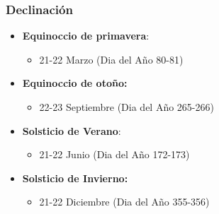 \documentclass[xcolor=dvipsnames]{beamer}
\begin{document}
\begin{frame}
  \frametitle{Declinación}
  \begin{itemize}
  \item \textbf{Equinoccio de primavera}:

    \begin{itemize}
    \item 21-22 Marzo (Dia del Año 80-81)
    \end{itemize}
  \item \textbf{Equinoccio de otoño:}

    \begin{itemize}
    \item 22-23 Septiembre (Dia del Año 265-266)
    \end{itemize}
  \item \textbf{Solsticio de Verano}:

    \begin{itemize}
    \item 21-22 Junio (Dia del Año 172-173)
    \end{itemize}
  \item \textbf{Solsticio de Invierno:}

    \begin{itemize}
    \item 21-22 Diciembre (Dia del Año 355-356)
    \end{itemize}
  \end{itemize}

\end{frame}
\end{document}
